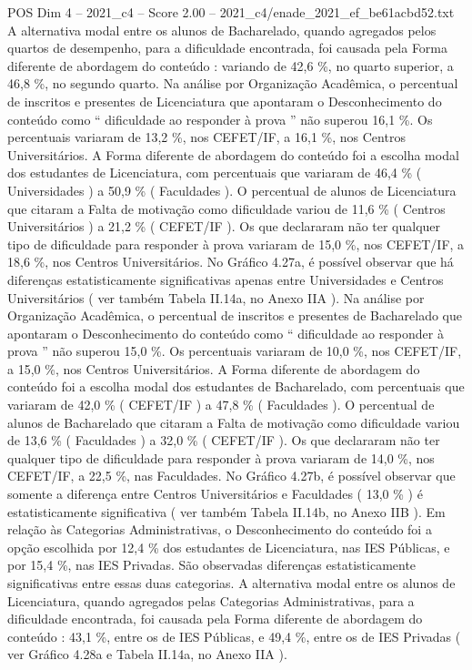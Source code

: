 \begin{textsample}{POS Dim 4 – 2021\_c4 – Score 2.00 – 2021\_c4/enade\_2021\_ef\_be61acbd52.txt}
A alternativa modal entre os alunos de Bacharelado, quando agregados pelos quartos de desempenho, para a dificuldade encontrada, foi causada pela Forma diferente de abordagem do conteúdo : variando de 42,6 \%, no quarto superior, a 46,8 \%, no segundo quarto.
Na análise por Organização Acadêmica, o percentual de inscritos e presentes de Licenciatura que apontaram o Desconhecimento do conteúdo como “ dificuldade ao responder à prova ” não superou 16,1 \%.
Os percentuais variaram de 13,2 \%, nos CEFET/IF, a 16,1 \%, nos Centros Universitários.
A Forma diferente de abordagem do conteúdo foi a escolha modal dos estudantes de Licenciatura, com percentuais que variaram de 46,4 \% ( Universidades ) a 50,9 \% ( Faculdades ).
O percentual de alunos de Licenciatura que citaram a Falta de motivação como dificuldade variou de 11,6 \% ( Centros Universitários ) a 21,2 \% ( CEFET/IF ).
Os que declararam não ter qualquer tipo de dificuldade para responder à prova variaram de 15,0 \%, nos CEFET/IF, a 18,6 \%, nos Centros Universitários.
No Gráfico 4.27a, é possível observar que há diferenças estatisticamente significativas apenas entre Universidades e Centros Universitários ( ver também Tabela II.14a, no Anexo IIA ).
Na análise por Organização Acadêmica, o percentual de inscritos e presentes de Bacharelado que apontaram o Desconhecimento do conteúdo como “ dificuldade ao responder à prova ” não superou 15,0 \%.
Os percentuais variaram de 10,0 \%, nos CEFET/IF, a 15,0 \%, nos Centros Universitários.
A Forma diferente de abordagem do conteúdo foi a escolha modal dos estudantes de Bacharelado, com percentuais que variaram de 42,0 \% ( CEFET/IF ) a 47,8 \% ( Faculdades ).
O percentual de alunos de Bacharelado que citaram a Falta de motivação como dificuldade variou de 13,6 \% ( Faculdades ) a 32,0 \% ( CEFET/IF ).
Os que declararam não ter qualquer tipo de dificuldade para responder à prova variaram de 14,0 \%, nos CEFET/IF, a 22,5 \%, nas Faculdades.
No Gráfico 4.27b, é possível observar que somente a diferença entre Centros Universitários e Faculdades ( 13,0 \% ) é estatisticamente significativa ( ver também Tabela II.14b, no Anexo IIB ).
Em relação às Categorias Administrativas, o Desconhecimento do conteúdo foi a opção escolhida por 12,4 \% dos estudantes de Licenciatura, nas IES Públicas, e por 15,4 \%, nas IES Privadas.
São observadas diferenças estatisticamente significativas entre essas duas categorias.
A alternativa modal entre os alunos de Licenciatura, quando agregados pelas Categorias Administrativas, para a dificuldade encontrada, foi causada pela Forma diferente de abordagem do conteúdo : 43,1 \%, entre os de IES Públicas, e 49,4 \%, entre os de IES Privadas ( ver Gráfico 4.28a e Tabela II.14a, no Anexo IIA ).

\end{textsample}
